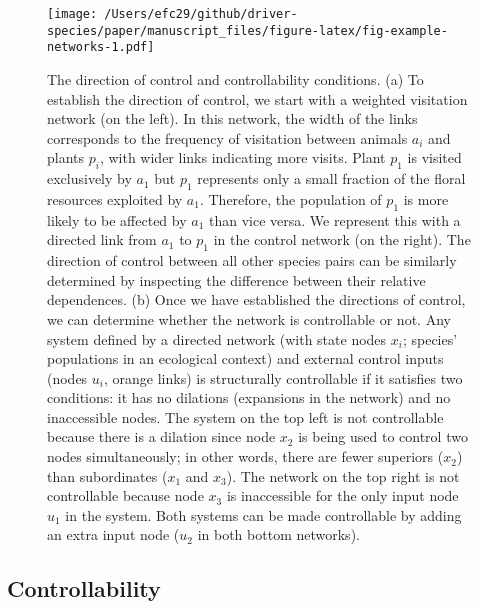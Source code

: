 \documentclass[a4paper]{artikel1}
\theoremstyle{definition}
\theoremstyle{definition}
\theoremstyle{definition}
\theoremstyle{remark}
\begin{document}
\begin{figure}
\centering
\texttt{[image: /Users/efc29/github/driver-species/paper/manuscript\_files/figure-latex/fig-example-networks-1.pdf]}
\caption{\label{fig:fig-example-networks}The direction of control and
controllability conditions. (a) To establish the direction of control,
we start with a weighted visitation network (on the left). In this
network, the width of the links corresponds to the frequency of
visitation between animals \(a_i\) and plants \(p_i\), with wider links
indicating more visits. Plant \(p_1\) is visited exclusively by \(a_1\)
but \(p_1\) represents only a small fraction of the floral resources
exploited by \(a_1\). Therefore, the population of \(p_1\) is more
likely to be affected by \(a_1\) than vice versa. We represent this with
a directed link from \(a_1\) to \(p_1\) in the control network (on the
right). The direction of control between all other species pairs can be
similarly determined by inspecting the difference between their relative
dependences. (b) Once we have established the directions of control, we
can determine whether the network is controllable or not. Any system
defined by a directed network (with state nodes \(x_i\); species'
populations in an ecological context) and external control inputs (nodes
\(u_i\), orange links) is structurally controllable if it satisfies two
conditions: it has no dilations (expansions in the network) and no
inaccessible nodes. The system on the top left is not controllable
because there is a dilation since node \(x_2\) is being used to control
two nodes simultaneously; in other words, there are fewer superiors
(\(x_2\)) than subordinates (\(x_1\) and \(x_3\)). The network on the
top right is not controllable because node \(x_3\) is inaccessible for
the only input node \(u_1\) in the system. Both systems can be made
controllable by adding an extra input node (\(u_2\) in both bottom
networks).}
\end{figure}

\subsection{Controllability}\label{controllability}
\end{document}
